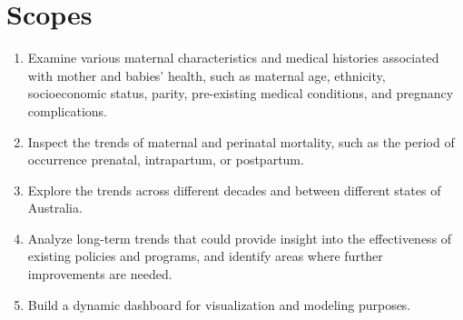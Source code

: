 \section{Scopes}
\begin{enumerate}
    \item  Examine various maternal characteristics and medical histories associated with mother and babies’ health, such as maternal age, ethnicity, socioeconomic status, parity, pre-existing medical conditions, and pregnancy complications.
    \item  Inspect the trends of maternal and perinatal mortality, such as the period of occurrence prenatal, intrapartum, or postpartum.
    \item Explore the trends across different decades and between different states of Australia.
    \item Analyze long-term trends that could provide insight into the effectiveness of existing policies and programs, and identify areas where further improvements are needed.
    \item Build a dynamic dashboard for visualization and modeling purposes.
\end{enumerate}

